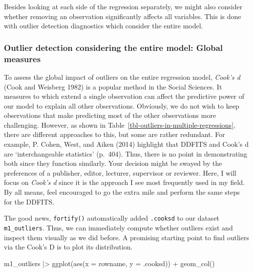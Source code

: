 \documentclass[
  letterpaper,
]{krantz}
\makeatletter
\newenvironment{Shaded}{\begin{snugshade}}{\end{snugshade}}
\newcommand{\AttributeTok}[1]{\textcolor[rgb]{0.40,0.45,0.13}{#1}}
\newcommand{\FunctionTok}[1]{\textcolor[rgb]{0.28,0.35,0.67}{#1}}
\newcommand{\NormalTok}[1]{\textcolor[rgb]{0.00,0.23,0.31}{#1}}
\newcommand{\SpecialCharTok}[1]{\textcolor[rgb]{0.37,0.37,0.37}{#1}}
\newenvironment{kframe}{%
\medskip{}
\setlength{\fboxsep}{.8em}
 \def\at@end@of@kframe{}%
 \ifinner\ifhmode%
  \def\at@end@of@kframe{\end{minipage}}%
  \begin{minipage}{\columnwidth}%
 \fi\fi%
 \def\FrameCommand##1{\hskip\@totalleftmargin \hskip-\fboxsep
 \colorbox{shadecolor}{##1}\hskip-\fboxsep
     \hskip-\linewidth \hskip-\@totalleftmargin \hskip\columnwidth}%
 \MakeFramed {\advance\hsize-\width
   \@totalleftmargin\z@ \linewidth\hsize
   \@setminipage}}%
 {\par\unskip\endMakeFramed%
 \at@end@of@kframe}
\renewenvironment{Shaded}{\begin{kframe}}{\end{kframe}}
\makeatother
\begin{document}
Besides looking at each side of the regression separately, we might also
consider whether removing an observation significantly affects all
variables. This is done with outlier detection diagnostics which
consider the entire model.

\subsubsection{Outlier detection considering the entire model: Global
measures}\label{sec-outlier-detection-global-measures}

To assess the global impact of outliers on the entire regression model,
\emph{Cook's d} (Cook and Weisberg 1982) is a popular method in the
Social Sciences. It measures to which extend a single observation can
affect the predictive power of our model to explain all other
observations. Obviously, we do not wish to keep observations that make
predicting most of the other observations more challenging. However, as
shown in Table~\ref{tbl-outliers-in-multiple-regressions}, there are
different approaches to this, but some are rather redundant. For
example, P. Cohen, West, and Aiken (2014) highlight that DDFITS and
Cook's d are `interchangeable statistics' (p.~404). Thus, there is no
point in demonstrating both since they function similarly. Your decision
might be swayed by the preferences of a publisher, editor, lecturer,
supervisor or reviewer. Here, I will focus on \emph{Cook's d} since it
is the approach I see most frequently used in my field. By all means,
feel encouraged to go the extra mile and perform the same steps for the
DDFITS.

The good news, \texttt{fortify()} automatically added \texttt{.cooksd}
to our dataset \texttt{m1\_outliers}. Thus, we can immediately compute
whether outliers exist and inspect them visually as we did before. A
promising starting point to find outliers via the Cook's D is to plot
its distribution.

\begin{Shaded}
\begin{Highlighting}[]
\NormalTok{m1\_outliers }\SpecialCharTok{|\textgreater{}}
  \FunctionTok{ggplot}\NormalTok{(}\FunctionTok{aes}\NormalTok{(}\AttributeTok{x =}\NormalTok{ rowname,}
             \AttributeTok{y =}\NormalTok{ .cooksd)) }\SpecialCharTok{+}
  \FunctionTok{geom\_col}\NormalTok{()}
\end{Highlighting}
\end{Shaded}
\end{document}
